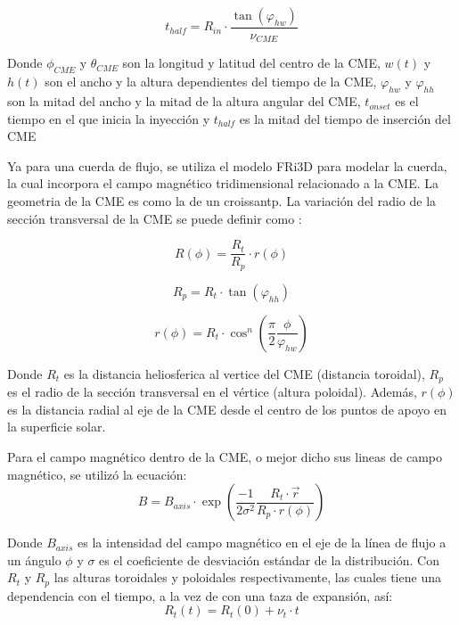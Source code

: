 \begin{equation}
t_{half}=R_{in}\cdot \frac{\tan(\varphi_{hw})}{\nu_{CME}}
\end{equation}

 
Donde $\phi_{CME}$ y $\theta_{CME}$ son la longitud y latitud del centro de la CME, $w(t)$ y $h(t)$ son el ancho y la altura dependientes del tiempo de la CME, $\varphi_{hw}$ y $\varphi_{hh}$ son la mitad del ancho y la mitad de la altura angular del CME, $t_{onset}$ es el tiempo en el que inicia la inyección y $t_{half}$ es la mitad del tiempo de inserción del CME

Ya para una cuerda de flujo, se utiliza el modelo FRi3D para modelar la cuerda, la cual incorpora el campo magnético tridimensional relacionado a la CME. La geometria de la \ac{CME} es como la de un croissantp. La variación del radio de la sección transversal de la \ac{CME} se puede definir como :

\begin{equation}
R(\phi)=\frac{R_{t}}{R_{p}}\cdot r(\phi)
\end{equation}

\begin{equation}
R_{p}=R_{t}\cdot \tan(\varphi_{hh})
\end{equation}

\begin{equation}
r(\phi)=R_{t}\cdot \cos^{n}\left( \frac{\pi}{2} \frac{\phi}{\varphi_{{hw}}} \right)
\end{equation}


Donde $R_t$ es la distancia heliosferica al vertice del \ac{CME} (distancia toroidal), $R_p$ es el radio de la sección transversal en el vértice (altura poloidal). Además, $r(\phi)$ es la distancia radial al eje de la \ac{CME} desde el centro de los puntos de apoyo en la superficie solar.

Para el campo magnético dentro de la CME, o mejor dicho sus lineas de campo magnético, se utilizó la ecuación:
\begin{equation}
B=B_{axis}\cdot \exp{\left(\frac{-1}{2\sigma^{2}}\frac{R_{t}\cdot \vec{r}}{R_{p}\cdot r(\phi)}\right)}
\end{equation}

Donde $B_{axis}$ es la intensidad del campo magnético en el eje de la línea de flujo a un ángulo $\phi$ y $\sigma$ es el coeficiente de desviación estándar de la distribución. Con $R_t$ y $R_p$ las alturas toroidales y poloidales respectivamente, las cuales tiene una dependencia con el tiempo, a la vez de con una taza de expansión, así:
\begin{equation}
R_{t}(t)=R_{t}(0)+\nu_{t}\cdot t
\end{equation}

